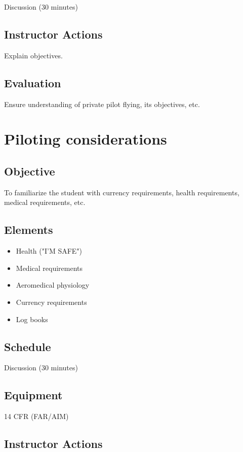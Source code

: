 \documentclass[twoside,openright]{report}
\begin{document}
Discussion (30 minutes)

\section{Instructor Actions}

Explain objectives.

\section{Evaluation}

Ensure understanding of private pilot flying, its objectives, etc.

\chapter{Piloting considerations}

\section{Objective}

To familiarize the student with currency requirements, health requirements,
medical requirements, etc.

\section{Elements}

\begin{itemize}
  \item Health ("I'M SAFE")
  \item Medical requirements
  \item Aeromedical physiology
  \item Currency requirements
  \item Log books
\end{itemize}

\section{Schedule}

Discussion (30 minutes)

\section{Equipment}

14 CFR (FAR/AIM)

\section{Instructor Actions}
\end{document}
